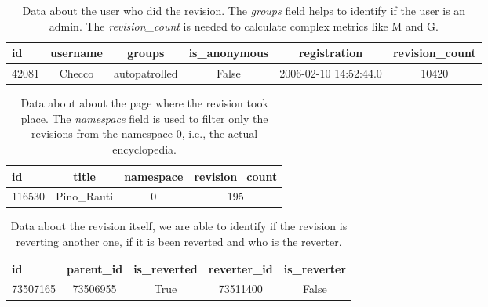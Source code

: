 \begin{table}[H]
    \centering
    \begin{tabularx}{\columnwidth}{@{}Xccccc@{}}
        \midrule
        \textbf{id} & \textbf{username} & \textbf{groups} & \textbf{is\_anonymous} & \textbf{registration} & \textbf{revision\_count}\\ \toprule
        42081 & Checco & autopatrolled & False & 2006-02-10 14:52:44.0 & 10420 \\

         \bottomrule
    \end{tabularx}
    
    \caption{Data about the user who did the revision. The \textit{groups} field helps to
     identify if the user is an admin. The \textit{revision\_count} is needed to calculate complex metrics like M and G. \label{table:user}}
\end{table}


\begin{table}[H]
    \centering
    \begin{tabularx}{\columnwidth}{@{}Xccc@{}}
        \midrule
        \textbf{id} & \textbf{title} & \textbf{namespace} & \textbf{revision\_count} \\ \toprule
        116530 & Pino\_Rauti & 0 &  195 
        \\

         \bottomrule
    \end{tabularx}
    
    \caption{Data about about the page where the revision took place. The \textit{namespace} field is used
    to filter only the revisions from the namespace 0, i.e., the actual encyclopedia. \label{table:page}}
\end{table}

\begin{table}[H]
    \centering
    \begin{tabularx}{\columnwidth}{@{}Xcccc@{}}
        \midrule
        \textbf{id} & \textbf{parent\_id} & \textbf{is\_reverted} & \textbf{reverter\_id} & \textbf{is\_reverter} \\ \toprule
        73507165 & 73506955 & True &  73511400 & False 
        \\

         \bottomrule
    \end{tabularx}
    
    \caption{Data about the revision itself, we are able to identify if the revision is reverting another
    one, if it is been reverted and who is the reverter. \label{table:revision} }
\end{table}


